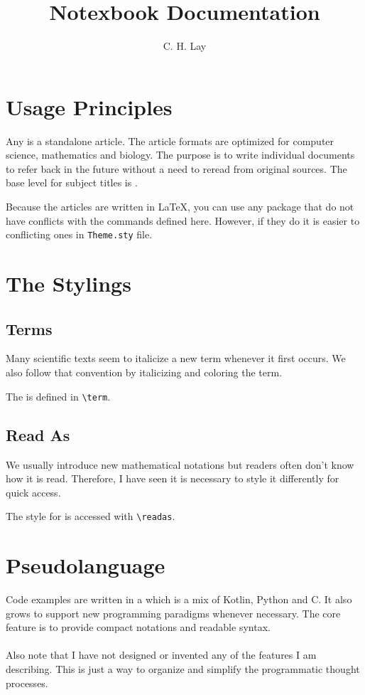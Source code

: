 \documentclass{book}
\title{Notexbook Documentation}
\author{C. H. Lay}
\begin{document}
\maketitle
\tableofcontents

\chapter{Usage Principles}
Any  is a standalone article.
The article formats are optimized for computer science, mathematics and biology.
The purpose is to write individual documents to refer back in the future without
a need to reread from original sources. The base level for subject titles is .

Because the articles are written in \LaTeX, you can use any package 
that do not have conflicts with the commands defined here.
However, if they do it is easier to conflicting ones in \verb|Theme.sty| file.

\chapter{The Stylings}
\section{Terms}
Many scientific texts seem to italicize a new term whenever it first occurs.
We also follow that convention by italicizing and coloring the term.

\begin{example}
The  is defined in \verb|\term|.
\end{example}

\section{Read As}

We usually introduce new mathematical notations but readers often don't know how it is read. Therefore, I have seen it is necessary to style it differently for quick access.

\begin{example}
The style for  is accessed with \verb|\readas|.
\end{example}

\chapter{Pseudolanguage}
Code examples are written in a  which is a mix of Kotlin, Python and C.
It also grows to support new programming paradigms whenever necessary.
The core feature is to provide compact notations and readable syntax.
\\\\
\noindent
Also note that I have not designed or invented any of the features I am describing.
This is just a way to organize and simplify the programmatic thought processes.
\end{document}
